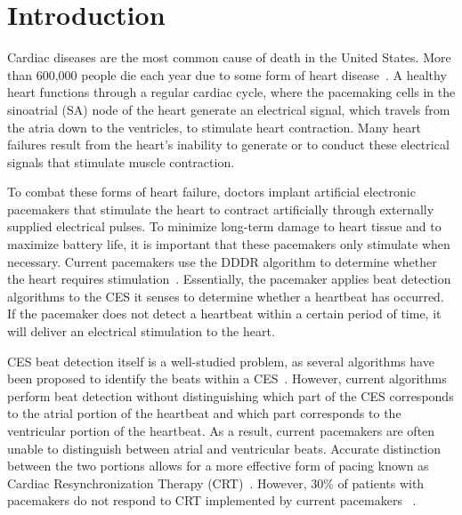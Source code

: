 \documentclass[conference]{IEEEtran}
\begin{document}




%
\IEEEpeerreviewmaketitle



\section{Introduction}
Cardiac diseases are the most common cause of death in
the United States. More than 600,000 people die each year
due to some form of heart disease~\cite{death-stats}. A healthy heart
functions through a regular cardiac cycle, where the pacemaking cells
in the sinoatrial (SA) node of the heart
generate an electrical signal, which travels from the atria
down to the ventricles, to stimulate heart contraction.
Many heart failures result from the heart's inability to
generate or to conduct these electrical signals
that stimulate muscle contraction. 

To combat these forms of heart failure, doctors implant artificial electronic pacemakers
that stimulate the heart
to contract artificially through externally supplied
electrical pulses.
To minimize long-term damage to heart tissue and to maximize battery life, it is important that these pacemakers only stimulate when necessary.
Current pacemakers use the 
DDDR algorithm to determine whether
the heart requires stimulation~\cite{basic-pacing}.
Essentially, the pacemaker applies beat detection algorithms to the CES it senses
to determine whether a
heartbeat has occurred. If the pacemaker does not detect a heartbeat
within a certain period of time, it will deliver an
electrical stimulation to the heart.

CES beat detection itself is a well-studied problem, as
several algorithms have been proposed to identify the
beats within a CES~\cite{realtime-qrs, ecg-filter}. However, current
algorithms perform beat detection without distinguishing
which part of the CES corresponds to the atrial
portion of the heartbeat and which part corresponds to 
the ventricular portion of the heartbeat. As a result,
current pacemakers are often unable to distinguish
between atrial and ventricular beats.
Accurate distinction between the two portions allows for a more effective form of pacing known as
Cardiac Resynchronization Therapy (CRT)~\cite{multisite-crt}.
However,  30\% of patients with pacemakers do 
not respond to CRT implemented by current pacemakers ~\cite{multisite-crt}. %
\end{document}
